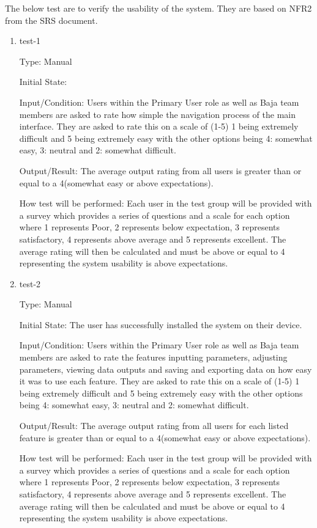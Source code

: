 \documentclass[12pt, titlepage]{article}
\begin{document}
The below test are to verify the usability of the system.
They are based on NFR2 from the SRS document.

\begin{enumerate}

\item{test-1\\}

Type: Manual
					
Initial State: 
					
Input/Condition: Users within the Primary User role as well as Baja team members are asked to rate how simple the navigation process of the main interface. 
They are asked to rate this on a scale of (1-5) 1 being extremely difficult and 5 being extremely easy with the other options being 4: somewhat easy, 3: neutral and 2: somewhat difficult. 
					
Output/Result: The average output rating from all users is greater than or equal to a 4(somewhat easy or above expectations).
					
How test will be performed: Each user in the test group will be provided with a survey which provides a series of questions and a scale for each option where 1 represents Poor, 2 represents below expectation, 3 represents satisfactory, 4 represents above average and 5 represents excellent.
The average rating will then be calculated and must be above or equal to 4 representing the system usability is above expectations.  

\item{test-2\\}
  
Type: Manual
            
Initial State: The user has successfully installed the system on their device.
            
Input/Condition: Users within the Primary User role as well as Baja team members are asked to rate the features inputting parameters, adjusting parameters, viewing data outputs and saving and exporting data on how easy it was to use each feature.
They are asked to rate this on a scale of (1-5) 1 being extremely difficult and 5 being extremely easy with the other options being 4: somewhat easy, 3: neutral and 2: somewhat difficult. 
            
Output/Result: The average output rating from all users for each listed feature is greater than or equal to a 4(somewhat easy or above expectations).
            
How test will be performed: Each user in the test group will be provided with a survey which provides a series of questions and a scale for each option where 1 represents Poor, 2 represents below expectation, 3 represents satisfactory, 4 represents above average and 5 represents excellent.
The average rating will then be calculated and must be above or equal to 4 representing the system usability is above expectations. 
  
\end{enumerate}
\end{document}
